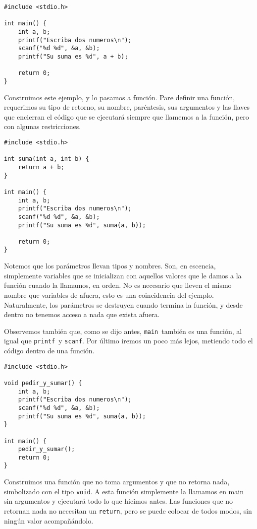 \documentclass[10pt]{article}
\newcommand{\cscanf}[0]{\lstinline{scanf}}
\newcommand{\cprintf}[0]{\lstinline{printf}}
\newcommand{\cmain}[0]{\lstinline{main}}
\begin{document}
\begin{lstlisting}
#include <stdio.h>

int main() {
	int a, b;
	printf("Escriba dos numeros\n");
	scanf("%d %d", &a, &b);
	printf("Su suma es %d", a + b);

	return 0;
}
\end{lstlisting}

Construimos este ejemplo, y lo pasamos a función. Pare definir una función, requerimos su tipo de retorno, su nombre, paréntesis, sus argumentos y las llaves que encierran el código que se ejecutará siempre que llamemos a la función, pero con algunas restricciones.

\begin{lstlisting}
#include <stdio.h>

int suma(int a, int b) {
	return a + b;
}

int main() {
	int a, b;
	printf("Escriba dos numeros\n");
	scanf("%d %d", &a, &b);
	printf("Su suma es %d", suma(a, b));

	return 0;
}
\end{lstlisting}

Notemos que los parámetros llevan tipos y nombres. Son, en escencia, simplemente variables que se inicializan con aquellos valores que le damos a la función cuando la llamamos, en orden. No es necesario que lleven el mismo nombre que variables de afuera, esto es una coincidencia del ejemplo. Naturalmente, los parámetros se destruyen cuando termina la función, y desde dentro no tenemos acceso a nada que exista afuera.

\bigskip

Observemos también que, como se dijo antes, \cmain\ también es una función, al igual que \cprintf\ y \cscanf. Por último iremos un poco más lejos, metiendo todo el código dentro de una función.

\begin{lstlisting}
#include <stdio.h>

void pedir_y_sumar() {
	int a, b;
	printf("Escriba dos numeros\n");
	scanf("%d %d", &a, &b);
	printf("Su suma es %d", suma(a, b));
}

int main() {
	pedir_y_sumar();
	return 0;
}
\end{lstlisting}

Construimos una función que no toma argumentos y que no retorna nada, simbolizado con el tipo \lstinline{void}. A esta función simplemente la llamamos en main sin argumentos y ejecutará todo lo que hicimos antes. Las funciones que no retornan nada no necesitan un \lstinline{return}, pero se puede colocar de todos modos, sin ningún valor acompañándolo.
\end{document}
